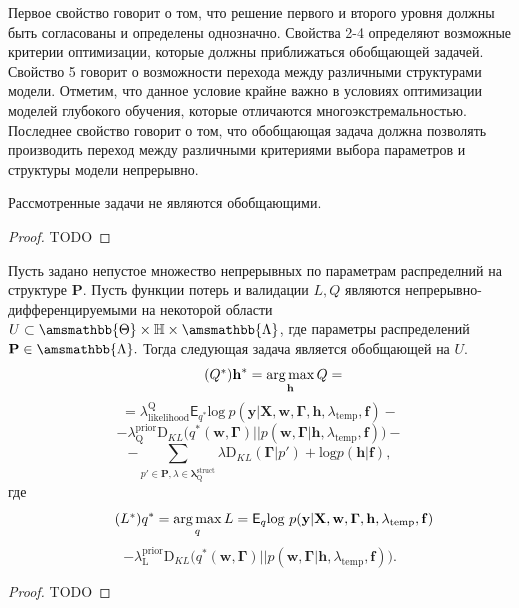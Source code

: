 Первое свойство говорит о том, что решение первого и второго уровня должны быть согласованы и определены однозначно.
Свойства 2-4 определяют возможные критерии оптимизации, которые должны приближаться обобщающей задачей.
Свойство 5 говорит о возможности перехода между различными структурами модели. Отметим, что данное условие крайне важно в условиях оптимизации моделей глубокого обучения, которые отличаются многоэкстремальностью.
Последнее свойство говорит о том, что обобщающая задача должна позволять производить переход между различными критериями выбора  параметров и структуры модели непрерывно.

\begin{theorem}Рассмотренные задачи не являются обобщающими.
\end{theorem}
\begin{proof}
TODO
\end{proof}

\begin{theorem}
Пусть задано непустое множество непрерывных по параметрам распределний на структуре $\mathbf{P}$. 
Пусть функции потерь и валидации $L,Q$ являются непрерывно-дифференцируемыми на некоторой области $U\subset \amsmathbb{\Theta} \times \mathbb{H} \times \amsmathbb{\Lambda}$, где параметры распределений $\mathbf{P} \in \amsmathbb{\Lambda}.$ 
Тогда следующая задача является обобщающей на $U$.
\begin{equation}
\tag{$Q^{*}$}
\label{eq:qopt}
\mathbf{h}^{*} = \argmax_{\mathbf{h}} Q = 
\end{equation}
\[
= {\lambda_\text{likelihood}^\text{Q}\mathsf{E}_{{q}^{*}} \text{log}~{p(\mathbf{y} | \mathbf{X}, \mathbf{w},\boldsymbol{\Gamma}, \mathbf{h}, \lambda_\text{temp}, \mathbf{f})}}
 -\]
\vspace{-0.3cm}
\[- {\lambda^\text{prior}_\text{Q}\text{D}_{KL}\bigl( q^{*}(\mathbf{w}, \boldsymbol{\Gamma}) || p(\mathbf{w}, \boldsymbol{\Gamma} |\mathbf{h}, \lambda_{\text{temp}},\mathbf{f}) \bigr)}  -\]
\vspace{-0.3cm}
\[
 - {\sum_{p' \in \mathbf{P}, \lambda \in \boldsymbol{\lambda}^\text{struct}_\text{Q}} \lambda\text{D}_{KL}(\boldsymbol{\Gamma} | p') + \text{log}p(\mathbf{h}|\mathbf{f})}, 
\]
где 
\begin{equation}
\tag{$L^{*}$}
{q}^{*} = \argmax_{q} L = 
{\mathsf{E}_q \text{log}~{p(\mathbf{y} | \mathbf{X}, \mathbf{w}, \boldsymbol{\Gamma}, \mathbf{h}, \lambda_{\text{temp}}, \mathbf{f})}}
\end{equation}
\vspace{-0.3cm}
\[- {\lambda^\text{prior}_\text{L}\text{D}_{KL}\bigl( q^{*}(\mathbf{w}, \boldsymbol{\Gamma}) || p(\mathbf{w}, \boldsymbol{\Gamma} |\mathbf{h}, \lambda_{\text{temp}},\mathbf{f}) \bigr)}.
\]
\end{theorem}
\begin{proof}
TODO
\end{proof}

